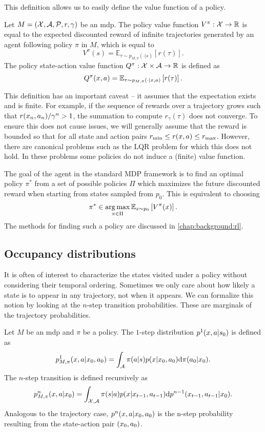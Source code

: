 This definition allows us to easily define the value function of a policy.

\begin{definition}
    Let $M = (\mathcal{X},\mathcal{A},\mathcal{P},r,\gamma)$ be an \ac{mdp}.
    The policy value function $V^\pi: \mathcal{X} \rightarrow \mathbb{R}$ is equal to the expected discounted reward of infinite trajectories generated by an agent following policy $\pi$ in $M$, which is equal to $$V^\pi(s) = \mathbb{E}_{\tau \sim p_{M,\pi}(\cdot|s)} \left[ r(\tau)\right].$$
    The policy state-action value function $Q^\pi: \mathcal{X} \times \mathcal{A} \rightarrow \mathbb{R}$ is defined as $$Q^\pi(x,a) = \mathbb{E}_{\tau \sim p_{M,\pi}(\cdot|x,a)} \left[ r(\tau)\right].$$
\end{definition}

This definition has an important caveat -- it assumes that the expectation exists and is finite.
For example, if the sequence of rewards over a trajectory grows such that $r(x_n,a_n)/\gamma^n > 1$, the summation to compute $r_\gamma(\tau)$ does not converge.
To ensure this does not cause issues, we will generally assume that the reward is bounded so that for all state and action pairs $r_{\min} \leq r(x,a) \leq r_{\max}$.
However, there are canonical problems such as the LQR problem for which this does not hold.
In these problems some policies do not induce a (finite) value function.

The goal of the agent in the standard MDP framework is to find an optimal policy $\pi^*$ from a set of possible policies $\Pi$ which maximizes the future discounted reward when starting from states sampled from $p_0$.
This is equivalent to choosing $$\pi^* \in \operatorname*{arg\,max}_{\pi \in \Pi} \mathbb{E}_{x \sim p_0}\left[V^\pi(x)\right].$$
The methods for finding such a policy are discussed in \autoref{chap:background:rl}.

\subsection{Occupancy distributions}

It is often of interest to characterize the states visited under a policy without considering their temporal ordering.
Sometimes we only care about how likely a state is to appear in any trajectory, not when it appears.
We can formalize this notion by looking at the $n$-step transition probabilities.
These are marginals of the trajectory probabilities.

\begin{definition}
    Let $M$ be an \ac{mdp} and $\pi$ be a policy.
    The $1$-step distribution $p^1(x,a|s_0)$ is defined as $$p^1_{M, \pi}(x,a|x_0,a_0) = \int_{\mathcal{A}} \pi(a|s) p(x|x_0,a_0) \mathrm{d} \pi(a_0|x_0).$$ 
    The $n$-step transition is defined recursively as $$p^n_{M, \pi}(x,a|x_0) = \int_{\mathcal{X},\mathcal{A}} \pi(s|a) p(x|x_{t-1},a_{t-1}) \mathrm{d} p^{n-1}(x_{t-1},a_{t-1}|x_0) .$$
    Analogous to the trajectory case, $p^n(x,a|x_0,a_0)$ is the n-step probability resulting from the state-action pair $(x_0,a_0)$.
\end{definition}

